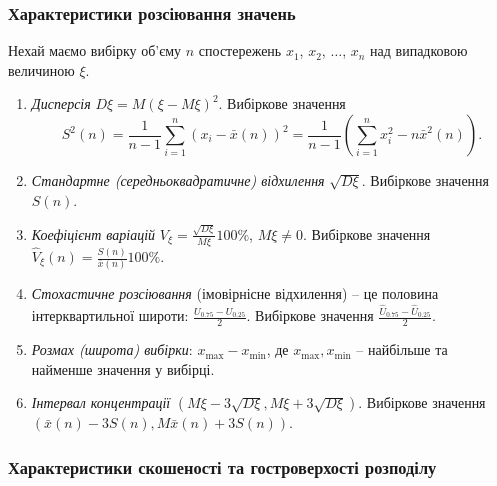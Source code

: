 
\subsubsection{Характеристики розсіювання значень}

Нехай маємо вибірку об'єму $n$ спостережень $x_1$, $x_2$, $\ldots$, $x_n$ над випадковою величиною $\xi$.

\begin{enumerate}
	\item \textit{Дисперсія} $D\xi = M(\xi - M\xi)^2$. Вибіркове значення \[ S^2(n) = \dfrac{1}{n-1} \sum_{i=1}^n (x_i - \bar{x}(n))^2 = \dfrac{1}{n-1} \left(\sum_{i=1}^n x_i^2 - n\bar{x}^2(n) \right). \]

	\item \textit{Стандартне (середньоквадратичне) відхилення} $\sqrt{D\xi}$. Вибіркове значення $S(n)$.
	
	\item \textit{Коефіцієнт варіацій} $V_\xi = \frac{\sqrt{D\xi}}{M\xi} 100\%$, $M\xi\ne0$. Вибіркове значення $\widehat{V}_\xi(n)=\frac{S(n)}{\bar x(n)} 100\%$.

	\item \textit{Стохастичне розсіювання} (імовірнісне відхилення) -- це половина інтерквартильної широти: $\frac{U_{0.75} - U_{0.25}}{2}$. Вибіркове значення $\frac{\widehat{U}_{0.75} - \widehat{U}_{0.25}}{2}$.

	\item \textit{Розмах (широта) вибірки}: $x_{\max}-x_{\min}$, де $x_{\max}, x_{\min}$ -- найбільше та найменше значення у вибірці.
	
	\item \textit{Інтервал концентрації} $(M\xi - 3\sqrt{D\xi}, M\xi + 3 \sqrt{D\xi})$. Вибіркове значення $(\bar x(n) - 3S(n), M\bar x(n) + 3 S(n))$.
\end{enumerate}

\subsubsection{Характеристики скошеності та гостроверхості розподілу}

